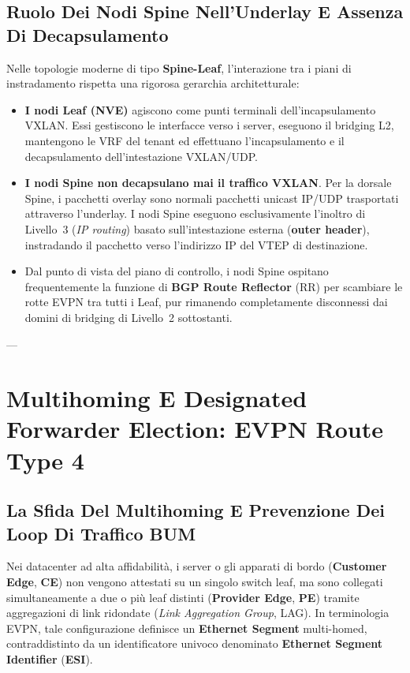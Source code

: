 \documentclass[11pt, a4paper]{article}
\begin{document}
\subsection{Ruolo Dei Nodi Spine Nell'Underlay E Assenza Di Decapsulamento}

Nelle topologie moderne di tipo \textbf{Spine-Leaf}, l'interazione tra i piani di instradamento rispetta una rigorosa gerarchia architetturale:
\begin{itemize}
    \item \textbf{I nodi Leaf (NVE)} agiscono come punti terminali dell'incapsulamento VXLAN. Essi gestiscono le interfacce verso i server, eseguono il bridging L2, mantengono le VRF del tenant ed effettuano l'incapsulamento e il decapsulamento dell'intestazione VXLAN/UDP.
    \item \textbf{I nodi Spine non decapsulano mai il traffico VXLAN}. Per la dorsale Spine, i pacchetti overlay sono normali pacchetti unicast IP/UDP trasportati attraverso l'underlay. I nodi Spine eseguono esclusivamente l'inoltro di Livello~3 (\emph{IP routing}) basato sull'intestazione esterna (\textbf{outer header}), instradando il pacchetto verso l'indirizzo IP del VTEP di destinazione.
    \item Dal punto di vista del piano di controllo, i nodi Spine ospitano frequentemente la funzione di \textbf{BGP Route Reflector} (RR) per scambiare le rotte EVPN tra tutti i Leaf, pur rimanendo completamente disconnessi dai domini di bridging di Livello~2 sottostanti.
\end{itemize}


---

\section{Multihoming E Designated Forwarder Election: EVPN Route Type 4}

\subsection{La Sfida Del Multihoming E Prevenzione Dei Loop Di Traffico BUM}

Nei datacenter ad alta affidabilità, i server o gli apparati di bordo (\textbf{Customer Edge}, \textbf{CE}) non vengono attestati su un singolo switch leaf, ma sono collegati simultaneamente a due o più leaf distinti (\textbf{Provider Edge}, \textbf{PE}) tramite aggregazioni di link ridondate (\emph{Link Aggregation Group}, LAG). In terminologia EVPN, tale configurazione definisce un \textbf{Ethernet Segment} multi-homed, contraddistinto da un identificatore univoco denominato \textbf{Ethernet Segment Identifier} (\textbf{ESI}).
\end{document}
